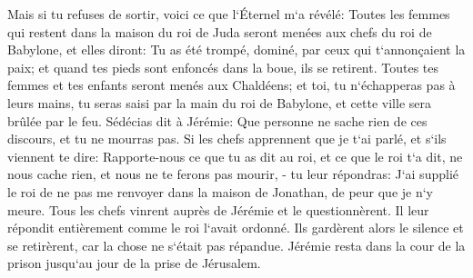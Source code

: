 \verse Mais si tu refuses de sortir, voici ce que l`Éternel m`a révélé: 
\verse Toutes les femmes qui restent dans la maison du roi de Juda seront menées aux chefs du roi de Babylone, et elles diront: Tu as été trompé, dominé, par ceux qui t`annonçaient la paix; et quand tes pieds sont enfoncés dans la boue, ils se retirent. 
\verse Toutes tes femmes et tes enfants seront menés aux Chaldéens; et toi, tu n`échapperas pas à leurs mains, tu seras saisi par la main du roi de Babylone, et cette ville sera brûlée par le feu. 
\verse Sédécias dit à Jérémie: Que personne ne sache rien de ces discours, et tu ne mourras pas. 
\verse Si les chefs apprennent que je t`ai parlé, et s`ils viennent te dire: Rapporte-nous ce que tu as dit au roi, et ce que le roi t`a dit, ne nous cache rien, et nous ne te ferons pas mourir, - 
\verse tu leur répondras: J`ai supplié le roi de ne pas me renvoyer dans la maison de Jonathan, de peur que je n`y meure. 
\verse Tous les chefs vinrent auprès de Jérémie et le questionnèrent. Il leur répondit entièrement comme le roi l`avait ordonné. Ils gardèrent alors le silence et se retirèrent, car la chose ne s`était pas répandue. 
\verse Jérémie resta dans la cour de la prison jusqu`au jour de la prise de Jérusalem. 


